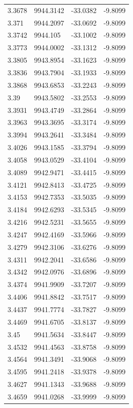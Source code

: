 \begin{table}[H]
\begin{tabular}{llll}
3.3678 & 9944.3142 & -33.0382 & -9.8099 \\
3.371 & 9944.2097 & -33.0692 & -9.8099 \\
3.3742 & 9944.105 & -33.1002 & -9.8099 \\
3.3773 & 9944.0002 & -33.1312 & -9.8099 \\
3.3805 & 9943.8954 & -33.1623 & -9.8099 \\
3.3836 & 9943.7904 & -33.1933 & -9.8099 \\
3.3868 & 9943.6853 & -33.2243 & -9.8099 \\
3.39 & 9943.5802 & -33.2553 & -9.8099 \\
3.3931 & 9943.4749 & -33.2864 & -9.8099 \\
3.3963 & 9943.3695 & -33.3174 & -9.8099 \\
3.3994 & 9943.2641 & -33.3484 & -9.8099 \\
3.4026 & 9943.1585 & -33.3794 & -9.8099 \\
3.4058 & 9943.0529 & -33.4104 & -9.8099 \\
3.4089 & 9942.9471 & -33.4415 & -9.8099 \\
3.4121 & 9942.8413 & -33.4725 & -9.8099 \\
3.4153 & 9942.7353 & -33.5035 & -9.8099 \\
3.4184 & 9942.6293 & -33.5345 & -9.8099 \\
3.4216 & 9942.5231 & -33.5655 & -9.8099 \\
3.4247 & 9942.4169 & -33.5966 & -9.8099 \\
3.4279 & 9942.3106 & -33.6276 & -9.8099 \\
3.4311 & 9942.2041 & -33.6586 & -9.8099 \\
3.4342 & 9942.0976 & -33.6896 & -9.8099 \\
3.4374 & 9941.9909 & -33.7207 & -9.8099 \\
3.4406 & 9941.8842 & -33.7517 & -9.8099 \\
3.4437 & 9941.7774 & -33.7827 & -9.8099 \\
3.4469 & 9941.6705 & -33.8137 & -9.8099 \\
3.45 & 9941.5634 & -33.8447 & -9.8099 \\
3.4532 & 9941.4563 & -33.8758 & -9.8099 \\
3.4564 & 9941.3491 & -33.9068 & -9.8099 \\
3.4595 & 9941.2418 & -33.9378 & -9.8099 \\
3.4627 & 9941.1343 & -33.9688 & -9.8099 \\
3.4659 & 9941.0268 & -33.9999 & -9.8099 \\

\end{tabular}
\end{table}
